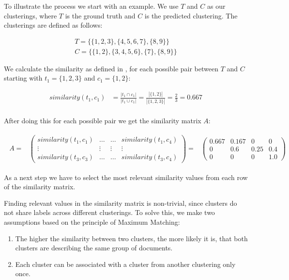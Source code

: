 To illustrate the process we start with an example.
We use $T$ and $C$ as our clusterings, where $T$ is the ground truth and $C$ is the predicted clustering.
The clusterings are defined as follows:

\begin{gather*}
    T = \{\{1,2,3\},\{4,5,6,7\},\{8,9\}\} \\
    C = \{\{1,2\},\{3,4,5,6\},\{7\},\{8,9\}\}
\end{gather*}

We calculate the similarity as defined in ,
for each possible pair between $T$ and $C$ starting with $t_1= \{1,2,3\}$ and $c_1 = \{1,2\}$:

\begin{align*}
    similarity(t_1,c_1) &=\frac{|t_1 \cap c_1|}{|t_1 \cup c_1|}
    = \frac{|\{1,2\}|}{|\{1,2,3\}|}
    = \frac{2}{3} = 0.667 \\
\end{align*}

After doing this for each possible pair we get the similarity matrix $A$:

\begin{gather*}
\begin{array}{rcl}
    A = & \left(\begin{array}{cccc}
        similarity(t_1,c_1) & \hdots & \hdots & similarity(t_1,c_4)\\
        \vdots & \vdots & \vdots & \vdots\\
        similarity(t_3,c_3) & \hdots & \hdots & similarity(t_3,c_4) \end{array}\right)
        = & \left(\begin{array}{cccc}
            0.667 & 0.167 & 0 & 0 \\
            0 & 0.6 & 0.25 & 0.4 \\
            0 &  0 & 0 & 1.0 \end{array}\right)
\end{array}
\end{gather*}

As a next step we have to select the most relevant similarity values from each row of the similarity matrix.

Finding relevant values in the similarity matrix is non-trivial,
since clusters do not share labels across different clusterings.
To solve this, we make two assumptions based on the principle of Maximum Matching:

\begin{enumerate}
    \item The higher the similarity between two clusters,
          the more likely it is, that both clusters are describing the same group of documents.
    \item Each cluster can be associated with a cluster from another clustering only once.
\end{enumerate}

